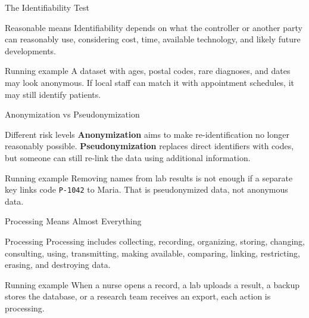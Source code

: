 \documentclass[presentation]{beamer}
\begin{document}
\begin{frame}[c]{The Identifiability Test}
\begin{block}{Reasonable means}
Identifiability depends on what the controller or another party can reasonably use, considering
cost, time, available technology, and likely future developments.
\end{block}

\begin{exampleblock}{Running example}
A dataset with ages, postal codes, rare diagnoses, and dates may look anonymous. If local staff can
match it with appointment schedules, it may still identify patients.
\end{exampleblock}
\end{frame}

\begin{frame}[c]{Anonymization vs Pseudonymization}
\begin{block}{Different risk levels}
\textbf{Anonymization} aims to make re-identification no longer reasonably possible.
\textbf{Pseudonymization} replaces direct identifiers with codes, but someone can still re-link the
data using additional information.
\end{block}

\begin{exampleblock}{Running example}
Removing names from lab results is not enough if a separate key links code \texttt{P-1042} to Maria.
That is pseudonymized data, not anonymous data.
\end{exampleblock}
\end{frame}

\begin{frame}[c]{Processing Means Almost Everything}
\begin{block}{Processing}
Processing includes collecting, recording, organizing, storing, changing, consulting, using,
transmitting, making available, comparing, linking, restricting, erasing, and destroying data.
\end{block}

\begin{exampleblock}{Running example}
When a nurse opens a record, a lab uploads a result, a backup stores the database, or a research
team receives an export, each action is processing.
\end{exampleblock}
\end{frame}
\end{document}
